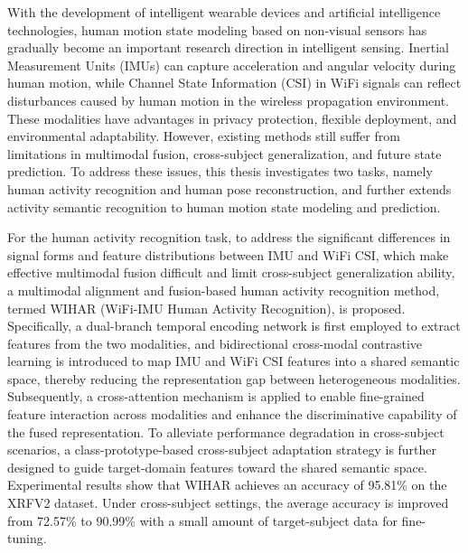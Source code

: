 \begin{englishabstract}

With the development of intelligent wearable devices and artificial intelligence technologies, human motion state modeling based on non-visual sensors has gradually become an important research direction in intelligent sensing. Inertial Measurement Units (IMUs) can capture acceleration and angular velocity during human motion, while Channel State Information (CSI) in WiFi signals can reflect disturbances caused by human motion in the wireless propagation environment. These modalities have advantages in privacy protection, flexible deployment, and environmental adaptability. However, existing methods still suffer from limitations in multimodal fusion, cross-subject generalization, and future state prediction. To address these issues, this thesis investigates two tasks, namely human activity recognition and human pose reconstruction, and further extends activity semantic recognition to human motion state modeling and prediction.

For the human activity recognition task, to address the significant differences in signal forms and feature distributions between IMU and WiFi CSI, which make effective multimodal fusion difficult and limit cross-subject generalization ability, a multimodal alignment and fusion-based human activity recognition method, termed WIHAR (WiFi-IMU Human Activity Recognition), is proposed. Specifically, a dual-branch temporal encoding network is first employed to extract features from the two modalities, and bidirectional cross-modal contrastive learning is introduced to map IMU and WiFi CSI features into a shared semantic space, thereby reducing the representation gap between heterogeneous modalities. Subsequently, a cross-attention mechanism is applied to enable fine-grained feature interaction across modalities and enhance the discriminative capability of the fused representation. To alleviate performance degradation in cross-subject scenarios, a class-prototype-based cross-subject adaptation strategy is further designed to guide target-domain features toward the shared semantic space. Experimental results show that WIHAR achieves an accuracy of 95.81\% on the XRFV2 dataset. Under cross-subject settings, the average accuracy is improved from 72.57\% to 90.99\% with a small amount of target-subject data for fine-tuning.


\end{englishabstract}
